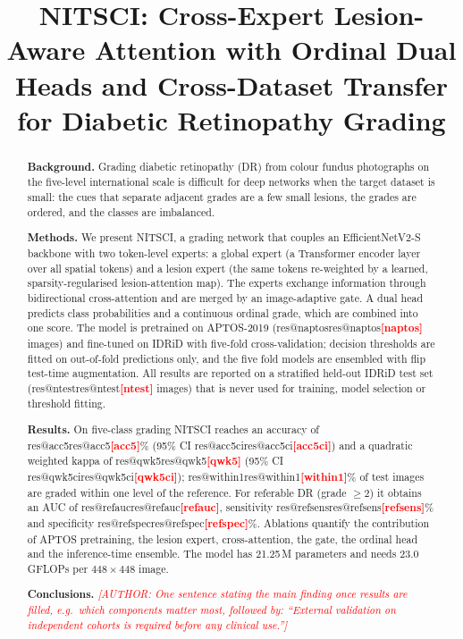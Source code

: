 \documentclass[11pt,a4paper]{article}
\title{\textbf{NITSCI: Cross-Expert Lesion-Aware Attention with Ordinal Dual Heads and Cross-Dataset Transfer for Diabetic Retinopathy Grading}}
\author{\authnote{Author names, affiliations, ORCID iDs and corresponding-author e-mail}}
\date{}
\makeatletter
\newcommand{\res}[1]{\ifcsname res@#1\endcsname\csname res@#1\endcsname\else\textcolor{red}{\textbf{[#1]}}\fi}
\newcommand{\authnote}[1]{\textcolor{red}{\textit{[AUTHOR: #1]}}}
\makeatother
\begin{document}
\maketitle
\linenumbers

\begin{abstract}
\noindent\textbf{Background.} Grading diabetic retinopathy (DR) from colour fundus photographs on the five-level
international scale is difficult for deep networks when the target dataset is small: the cues that separate
adjacent grades are a few small lesions, the grades are ordered, and the classes are imbalanced.

\noindent\textbf{Methods.} We present NITSCI, a grading network that couples an EfficientNetV2-S backbone with two
token-level experts: a global expert (a Transformer encoder layer over all spatial tokens) and a lesion expert
(the same tokens re-weighted by a learned, sparsity-regularised lesion-attention map). The experts exchange
information through bidirectional cross-attention and are merged by an image-adaptive gate. A dual head predicts
class probabilities and a continuous ordinal grade, which are combined into one score. The model is pretrained on
APTOS-2019 (\res{naptos} images) and fine-tuned on IDRiD with five-fold cross-validation; decision thresholds are
fitted on out-of-fold predictions only, and the five fold models are ensembled with flip test-time augmentation.
All results are reported on a stratified held-out IDRiD test set (\res{ntest} images) that is never used for
training, model selection or threshold fitting.

\noindent\textbf{Results.} On five-class grading NITSCI reaches an accuracy of \res{acc5}\% (95\% CI
\res{acc5ci}) and a quadratic weighted kappa of \res{qwk5} (95\% CI \res{qwk5ci}); \res{within1}\% of test images are
graded within one level of the reference. For referable DR (grade $\geq 2$) it obtains an AUC of \res{refauc},
sensitivity \res{refsens}\% and specificity \res{refspec}\%. Ablations quantify the contribution of APTOS
pretraining, the lesion expert, cross-attention, the gate, the ordinal head and the inference-time ensemble.
The model has 21.25\,M parameters and needs 23.0\,GFLOPs per $448\times448$ image.

\noindent\textbf{Conclusions.} \authnote{One sentence stating the main finding once results are filled, e.g.\ which
components matter most, followed by: ``External validation on independent cohorts is required before any
clinical use.''}
\end{abstract}
\end{document}
